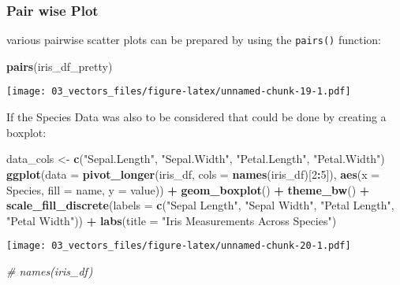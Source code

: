 \documentclass[
]{article}
\newenvironment{Shaded}{\begin{snugshade}}{\end{snugshade}}
\newcommand{\CommentTok}[1]{\textcolor[rgb]{0.56,0.35,0.01}{\textit{#1}}}
\newcommand{\DataTypeTok}[1]{\textcolor[rgb]{0.13,0.29,0.53}{#1}}
\newcommand{\DecValTok}[1]{\textcolor[rgb]{0.00,0.00,0.81}{#1}}
\newcommand{\KeywordTok}[1]{\textcolor[rgb]{0.13,0.29,0.53}{\textbf{#1}}}
\newcommand{\NormalTok}[1]{#1}
\newcommand{\OperatorTok}[1]{\textcolor[rgb]{0.81,0.36,0.00}{\textbf{#1}}}
\newcommand{\StringTok}[1]{\textcolor[rgb]{0.31,0.60,0.02}{#1}}
\begin{document}
\hypertarget{pair-wise-plot}{%
\subsubsection{Pair wise Plot}\label{pair-wise-plot}}

various pairwise scatter plots can be prepared by using the
\texttt{pairs()} function:

\begin{Shaded}
\begin{Highlighting}[]
\KeywordTok{pairs}\NormalTok{(iris\_df\_pretty)}
\end{Highlighting}
\end{Shaded}

\texttt{[image: 03\_vectors\_files/figure-latex/unnamed-chunk-19-1.pdf]}

If the Species Data was also to be considered that could be done by
creating a boxplot:

\begin{Shaded}
\begin{Highlighting}[]
\NormalTok{data\_cols <{-}}\StringTok{ }\KeywordTok{c}\NormalTok{(}\StringTok{"Sepal.Length"}\NormalTok{, }\StringTok{"Sepal.Width"}\NormalTok{, }\StringTok{"Petal.Length"}\NormalTok{, }\StringTok{"Petal.Width"}\NormalTok{)}
\KeywordTok{ggplot}\NormalTok{(}\DataTypeTok{data =} \KeywordTok{pivot\_longer}\NormalTok{(iris\_df, }\DataTypeTok{cols =} \KeywordTok{names}\NormalTok{(iris\_df)[}\DecValTok{2}\OperatorTok{:}\DecValTok{5}\NormalTok{]), }\KeywordTok{aes}\NormalTok{(}\DataTypeTok{x =}\NormalTok{ Species, }\DataTypeTok{fill =}\NormalTok{ name, }\DataTypeTok{y =}\NormalTok{ value)) }\OperatorTok{+}
\StringTok{  }\KeywordTok{geom\_boxplot}\NormalTok{() }\OperatorTok{+}\StringTok{ }
\StringTok{  }\KeywordTok{theme\_bw}\NormalTok{() }\OperatorTok{+}
\StringTok{  }\KeywordTok{scale\_fill\_discrete}\NormalTok{(}\DataTypeTok{labels =} \KeywordTok{c}\NormalTok{(}\StringTok{"Sepal Length"}\NormalTok{, }\StringTok{"Sepal Width"}\NormalTok{, }\StringTok{"Petal Length"}\NormalTok{, }\StringTok{"Petal Width"}\NormalTok{)) }\OperatorTok{+}
\StringTok{  }\KeywordTok{labs}\NormalTok{(}\DataTypeTok{title =} \StringTok{"Iris Measurements Across Species"}\NormalTok{)}
\end{Highlighting}
\end{Shaded}

\texttt{[image: 03\_vectors\_files/figure-latex/unnamed-chunk-20-1.pdf]}

\begin{Shaded}
\begin{Highlighting}[]
\CommentTok{\# names(iris\_df)}
\end{Highlighting}
\end{Shaded}
\end{document}
